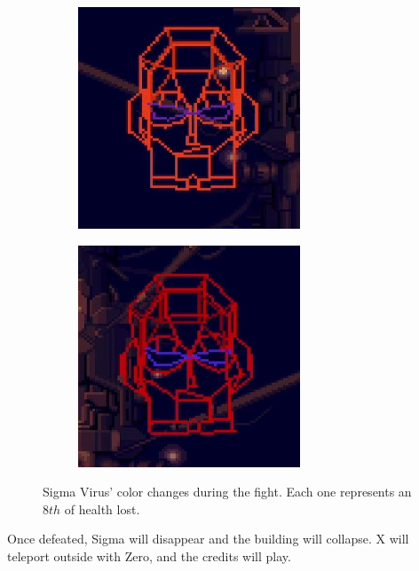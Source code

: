 \begin{figure}[htp]
\begin{subfigure}{0.3\linewidth}
	\end{subfigure}
	\begin{subfigure}{0.3\linewidth}
		\centering
		\includegraphics[width=\linewidth]{figures/X2/Hunter_stages/Sigma_virus_phase_6.png}	
	\end{subfigure}
	\begin{subfigure}{0.3\linewidth}
		\centering
		\includegraphics[width=\linewidth]{figures/X2/Hunter_stages/Sigma_virus_phase_7.png}
	\end{subfigure}
	\caption{Sigma Virus' color changes during the fight. Each one represents an $8th$ of health lost.}
\end{figure}
Once defeated, Sigma will disappear and the building will collapse. X will teleport outside with Zero, and the credits will play.

